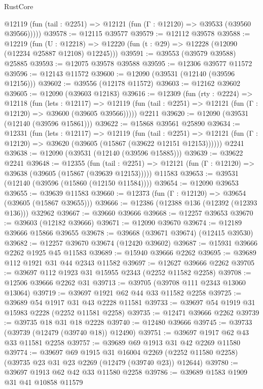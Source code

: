 \begin{lexlean}{RustCore}
\begin{coremodule}
      @12119 (fun (tail : @2251) => @12121 (fun (Γ : @12120) => @39533 (@39560 @39566)))))
@39578 := @12115 @39577
@39579 := @12112 @39578
@39588 := @12219
    (fun (U : @12218) => @12220 (fun (t : @29) => @12228 (@12090 (@12234 @25887 @12108) @12245)))
@39591 := @39553 (@39579 @39588) @25885
@39593 := @12075 @39578 @39588
@39595 := @12306 @39577 @11572
@39596 := @12143 @11572
@39600 := @12090 (@39531 (@12140 (@39596 @12156)))
@39602 := @39556 (@12178 @11572)
@39603 := @12162 @39602
@39605 := @12090 (@39603 @12183)
@39616 := @12309
    (fun (rty : @2224) =>
    @12118
      (fun (lets : @12117) =>
      @12119 (fun (tail : @2251) => @12121 (fun (Γ : @12120) => @39600 (@39605 @39566)))))
    @2211
@39620 := @12090 (@39531 (@12140 (@39596 @15861)))
@39622 := @15868 @39561 @25890
@39634 := @12331
    (fun (lets : @12117) =>
    @12119
      (fun (tail : @2251) =>
      @12121 (fun (Γ : @12120) => @39620 (@39605 (@15867 (@39622 @12151 @12153))))))
    @2241
@39638 := @12090 (@39531 (@12140 (@39596 @15885)))
@39639 := @39622 @2241
@39648 := @12355
    (fun (tail : @2251) => @12121 (fun (Γ : @12120) => @39638 (@39605 (@15867 (@39639 @12153)))))
    @11583
@39653 := @39531 (@12140 (@39596 (@15860 (@12150 @11584))))
@39654 := @12090 @39653
@39655 := @39639 @11583
@39660 := @12373 (fun (Γ : @12120) => @39654 (@39605 (@15867 @39655)))
@39666 := @12386 (@12388 @136 (@12392 (@12393 @136))) @32962
@39667 := @39660 @39666
@39668 := @12257 @39653
@39670 := @39603 (@12182 @39666)
@39671 := @12090 @39670
@39674 := @12189 @39666 @15866 @39655
@39678 := @39668 (@39671 @39674) (@12415 @39530)
@39682 := @12257 @39670 @39674 (@12420 @39602)
@39687 := @15931 @39666 @2262 @1925 @45 @11583
@39689 := @15940 @39666 @2262
@39695 := @39689 @112 @1921 @31 @44 @2343 @11582
@39697 := @12627 @39666 @2262
@39705 := @39697 @112 @1923 @31 @15955 @2343 (@2252 @11582 @2258)
@39708 := @12506 @39666 @2262 @31
@39713 := @39705 (@39708 @111 @2343 @13060 @13064)
@39719 := @39697 @1921 @62 @44 @33 @11582 @2258
@39725 := @39689 @54 @1917 @31 @43 @2228 @11581
@39733 := @39697 @54 @1919 @31 @15983 @2228 (@2252 @11581 @2258)
@39735 := @12471 @39666 @2262
@39739 := @39735 @18 @31 @18 @2228
@39740 := @12480 @39666
@39745 := @39733 (@39739 (@12479 (@39740 @18)) @12490)
@39751 := @39697 @1917 @62 @43 @33 @11581 @2258
@39757 := @39689 @69 @1913 @31 @42 @2269 @11580
@39774 := @39697
    @69
    @1915
    @31
    @16004
    @2269
    (@2252 @11580 @2258)
    (@39735 @23 @31 @23 @2269 (@12479 (@39740 @23)) @12644)
@39780 := @39697 @1913 @62 @42 @33 @11580 @2258
@39786 := @39689 @1583 @1909 @31 @41 @10858 @11579

\end{coremodule}
\end{lexlean}

